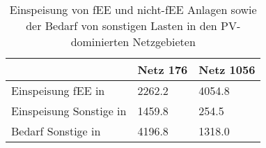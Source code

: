 {
\renewcommand{\arraystretch}{1.2}%
\begin{table}[H]
	\begin{center}
		\caption{Einspeisung von fEE und nicht-fEE Anlagen sowie der Bedarf von sonstigen Lasten in den PV-dominierten Netzgebieten}
		\begin{tabu} to 0.7\textwidth {X[2] X[1, r] X[1, r]}
			\toprule
											  & Netz \num{176} & Netz \num{1056} \\ \midrule
			Einspeisung fEE in \si{\mwh}      & \num{2262.2}   & \num{4054.8}    \\
			Einspeisung Sonstige in \si{\mwh} & \num{1459.8}   & \num{254.5}     \\
			Bedarf Sonstige  in \si{\mwh}     & \num{4196.8}   & \num{1318.0}    \\ \bottomrule
		\end{tabu}
		\label{tab:pv_dominated_week_a_char}
	\end{center}
	\vspace{-3mm}%
\end{table}
}
